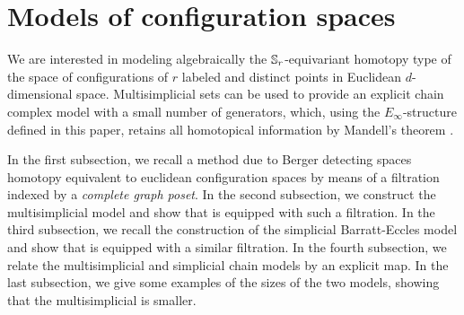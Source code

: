 
\section{Models of configuration spaces}

We are interested in modeling algebraically the $\mathbb{S}_r$-equivariant homotopy type of the space of configurations of $r$ labeled and distinct points in Euclidean $d$-dimensional space.
Multisimplicial sets can be used to provide an explicit chain complex model with a small number of generators, which, using the $E_\infty$-structure defined in this paper, retains all homotopical information by Mandell's theorem \cite{mandell2006homotopy_type}.

In the first subsection, we recall a method due to Berger detecting spaces homotopy equivalent to euclidean configuration spaces by means of a filtration indexed by a {\em complete graph poset}.
In the second subsection, we construct the multisimplicial model and show that is equipped with such a filtration.
In the third subsection, we recall the construction of the simplicial Barratt-Eccles model and show that is equipped with a similar filtration.
In the fourth subsection, we relate the multisimplicial and simplicial chain models by an explicit map. In the last subsection, we give some examples of the sizes of the two models, showing that the multisimplicial is smaller.







